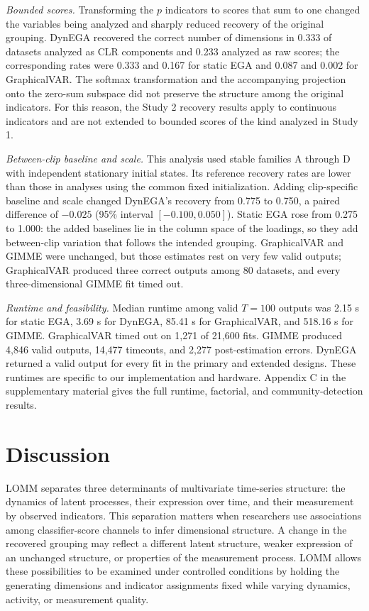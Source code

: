 \documentclass[
]{article}
\begin{document}
\emph{Bounded scores.} Transforming the \(p\) indicators to scores that
sum to one changed the variables being analyzed and sharply reduced
recovery of the original grouping. DynEGA recovered the correct number
of dimensions in 0.333 of datasets analyzed as CLR components and 0.233
analyzed as raw scores; the corresponding rates were 0.333 and 0.167 for
static EGA and 0.087 and 0.002 for GraphicalVAR. The softmax
transformation and the accompanying projection onto the zero-sum
subspace did not preserve the structure among the original indicators.
For this reason, the Study 2 recovery results apply to continuous
indicators and are not extended to bounded scores of the kind analyzed
in Study 1.

\emph{Between-clip baseline and scale.} This analysis used stable
families A through D with independent stationary initial states. Its
reference recovery rates are lower than those in analyses using the
common fixed initialization. Adding clip-specific baseline and scale
changed DynEGA's recovery from 0.775 to 0.750, a paired difference of
\(-0.025\) (95\% interval \([-0.100,0.050]\)). Static EGA rose from
0.275 to 1.000: the added baselines lie in the column space of the
loadings, so they add between-clip variation that follows the intended
grouping. GraphicalVAR and GIMME were unchanged, but those estimates
rest on very few valid outputs; GraphicalVAR produced three correct
outputs among 80 datasets, and every three-dimensional GIMME fit timed
out.

\emph{Runtime and feasibility.} Median runtime among valid \(T=100\)
outputs was 2.15 s for static EGA, 3.69 s for DynEGA, 85.41 s for
GraphicalVAR, and 518.16 s for GIMME. GraphicalVAR timed out on 1,271 of
21,600 fits. GIMME produced 4,846 valid outputs, 14,477 timeouts, and
2,277 post-estimation errors. DynEGA returned a valid output for every
fit in the primary and extended designs. These runtimes are specific to
our implementation and hardware. Appendix C in the supplementary
material gives the full runtime, factorial, and community-detection
results.

\section{Discussion}\label{discussion}

LOMM separates three determinants of multivariate time-series structure:
the dynamics of latent processes, their expression over time, and their
measurement by observed indicators. This separation matters when
researchers use associations among classifier-score channels to infer
dimensional structure. A change in the recovered grouping may reflect a
different latent structure, weaker expression of an unchanged structure,
or properties of the measurement process. LOMM allows these
possibilities to be examined under controlled conditions by holding the
generating dimensions and indicator assignments fixed while varying
dynamics, activity, or measurement quality.
\end{document}
